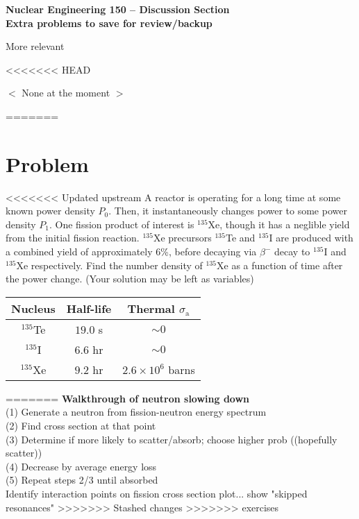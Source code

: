 \documentclass{report}
\begin{document}
\begin{center}
\textbf{\large Nuclear Engineering 150 -- Discussion Section}\\ 
\textbf{Extra problems to save for review/backup}
\end{center}
\vspace{1cm}


{\huge More relevant}

<<<<<<< HEAD
\begin{center}
$<$ None at the moment $>$
\end{center}
=======
\section*{Problem}

<<<<<<< Updated upstream
A reactor is operating for a long time at some known power density $P_0$. Then, it instantaneously changes power to some power density $P_1$. One fission product of interest is $^{135}$Xe, though it has a neglible yield from the initial fission reaction. $^{135}$Xe precursors $^{135}$Te and $^{135}$I are produced with a combined yield of approximately 6\%, before decaying via $\beta^{-}$ decay to $^{135}$I and $^{135}$Xe respectively. Find the number density of $^{135}$Xe as a function of time after the power change. (Your solution may be left as variables)

\begin{table}[htbp]
	\centering
	\begin{tabular}{|c|c|c|}
			\hline
			Nucleus		&	Half-life 	& Thermal $\sigma_{\text{a}}$ \\
			\hline
			$^{135}$Te	&  $19.0$ s 	& $\sim 0$\\
			$^{135}$I	&  $6.6$ hr 	& $\sim 0$\\
			$^{135}$Xe	&  $9.2$ hr 	& $2.6 \times 10^6$ barns \\
			\hline
	\end{tabular}
	\label{tab:design-specs}
\end{table}


=======
\textbf{Walkthrough of neutron slowing down}\\
(1) Generate a neutron from fission-neutron energy spectrum\\
(2) Find cross section at that point\\
(3) Determine if more likely to scatter/absorb; choose higher prob ((hopefully scatter))\\
(4) Decrease by average energy loss\\
(5) Repeat steps 2/3 until absorbed\\
Identify interaction points on fission cross section plot... show "skipped resonances"
>>>>>>> Stashed changes
>>>>>>> exercises
\end{document}
